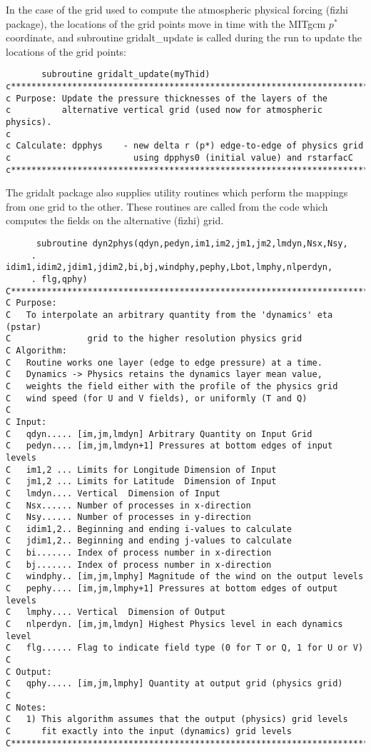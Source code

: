 \noindent In the case of the grid used to compute the atmospheric physical
forcing (fizhi package), the locations of the grid points move in time with 
the MITgcm $p^*$ coordinate, and subroutine gridalt\_update is called during 
the run to update the locations of the grid points:

\begin{verbatim}
       subroutine gridalt_update(myThid)
c***********************************************************************
c Purpose: Update the pressure thicknesses of the layers of the
c          alternative vertical grid (used now for atmospheric physics).
c
c Calculate: dpphys    - new delta r (p*) edge-to-edge of physics grid
c                        using dpphys0 (initial value) and rstarfacC
c***********************************************************************
\end{verbatim}

\noindent The gridalt package also supplies utility routines which perform
the mappings from one grid to the other. These routines are called from the 
code which computes the fields on the alternative (fizhi) grid.

\begin{verbatim}
      subroutine dyn2phys(qdyn,pedyn,im1,im2,jm1,jm2,lmdyn,Nsx,Nsy,
     . idim1,idim2,jdim1,jdim2,bi,bj,windphy,pephy,Lbot,lmphy,nlperdyn,
     . flg,qphy)
C***********************************************************************
C Purpose:
C   To interpolate an arbitrary quantity from the 'dynamics' eta (pstar)
C               grid to the higher resolution physics grid
C Algorithm:
C   Routine works one layer (edge to edge pressure) at a time.
C   Dynamics -> Physics retains the dynamics layer mean value,
C   weights the field either with the profile of the physics grid
C   wind speed (for U and V fields), or uniformly (T and Q)
C
C Input:
C   qdyn..... [im,jm,lmdyn] Arbitrary Quantity on Input Grid
C   pedyn.... [im,jm,lmdyn+1] Pressures at bottom edges of input levels
C   im1,2 ... Limits for Longitude Dimension of Input
C   jm1,2 ... Limits for Latitude  Dimension of Input
C   lmdyn.... Vertical  Dimension of Input
C   Nsx...... Number of processes in x-direction
C   Nsy...... Number of processes in y-direction
C   idim1,2.. Beginning and ending i-values to calculate
C   jdim1,2.. Beginning and ending j-values to calculate
C   bi....... Index of process number in x-direction
C   bj....... Index of process number in x-direction
C   windphy.. [im,jm,lmphy] Magnitude of the wind on the output levels
C   pephy.... [im,jm,lmphy+1] Pressures at bottom edges of output levels
C   lmphy.... Vertical  Dimension of Output
C   nlperdyn. [im,jm,lmdyn] Highest Physics level in each dynamics level
C   flg...... Flag to indicate field type (0 for T or Q, 1 for U or V)
C
C Output:
C   qphy..... [im,jm,lmphy] Quantity at output grid (physics grid)
C
C Notes:
C   1) This algorithm assumes that the output (physics) grid levels
C      fit exactly into the input (dynamics) grid levels
C***********************************************************************
\end{verbatim}

